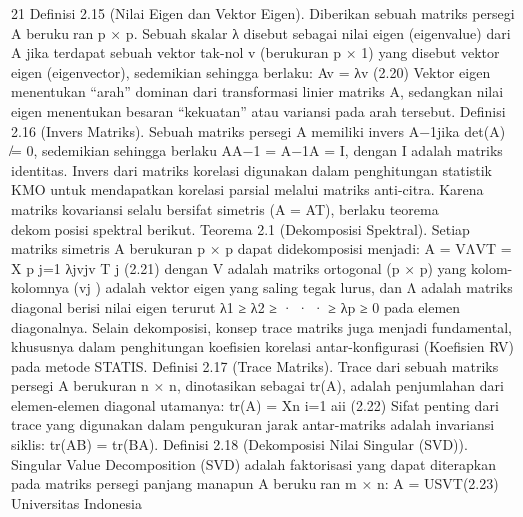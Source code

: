 21
Definisi 2.15 (Nilai Eigen dan Vektor Eigen). Diberikan sebuah matriks persegi A berukuran p × p. Sebuah skalar λ disebut sebagai nilai eigen (eigenvalue) dari A jika terdapat
sebuah vektor tak-nol v (berukuran p × 1) yang disebut vektor eigen (eigenvector),
sedemikian sehingga berlaku:
Av = λv (2.20)
Vektor eigen menentukan “arah” dominan dari transformasi linier matriks A, sedangkan
nilai eigen menentukan besaran “kekuatan” atau variansi pada arah tersebut.
Definisi 2.16 (Invers Matriks). Sebuah matriks persegi A memiliki invers A−1jika
det(A) ̸= 0, sedemikian sehingga berlaku AA−1 = A−1A = I, dengan I adalah matriks
identitas. Invers dari matriks korelasi digunakan dalam penghitungan statistik KMO untuk
mendapatkan korelasi parsial melalui matriks anti-citra.
Karena matriks kovariansi selalu bersifat simetris (A = AT), berlaku teorema dekomposisi spektral berikut.
Teorema 2.1 (Dekomposisi Spektral). Setiap matriks simetris A berukuran p × p dapat
didekomposisi menjadi:
A = VΛVT =
X
p
j=1
λjvjv
T
j
(2.21)
dengan V adalah matriks ortogonal (p × p) yang kolom-kolomnya (vj ) adalah vektor
eigen yang saling tegak lurus, dan Λ adalah matriks diagonal berisi nilai eigen terurut
λ1 ≥ λ2 ≥ · · · ≥ λp ≥ 0 pada elemen diagonalnya.
Selain dekomposisi, konsep trace matriks juga menjadi fundamental, khususnya dalam
penghitungan koefisien korelasi antar-konfigurasi (Koefisien RV) pada metode STATIS.
Definisi 2.17 (Trace Matriks). Trace dari sebuah matriks persegi A berukuran n × n,
dinotasikan sebagai tr(A), adalah penjumlahan dari elemen-elemen diagonal utamanya:
tr(A) = Xn
i=1
aii (2.22)
Sifat penting dari trace yang digunakan dalam pengukuran jarak antar-matriks adalah
invariansi siklis: tr(AB) = tr(BA).
Definisi 2.18 (Dekomposisi Nilai Singular (SVD)). Singular Value Decomposition (SVD)
adalah faktorisasi yang dapat diterapkan pada matriks persegi panjang manapun A berukuran m × n:
A = USVT(2.23)
Universitas Indonesia

